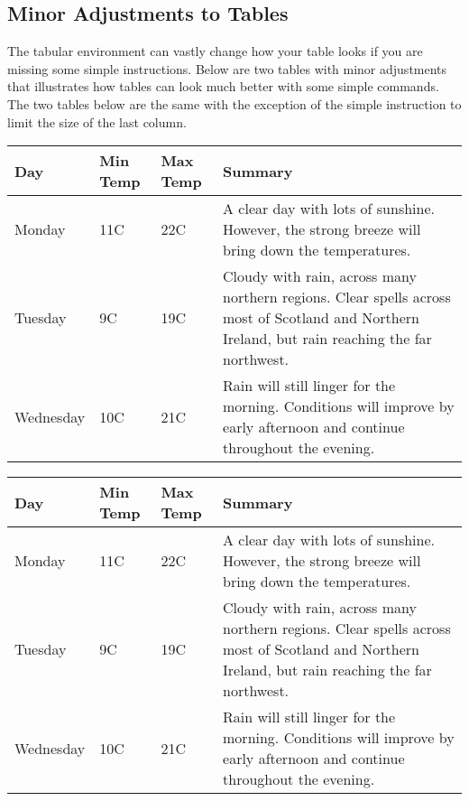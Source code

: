 \documentclass[10pt]{article}
\begin{document}
\subsection*{Minor Adjustments to Tables}
The tabular environment can vastly change how your table looks if you are missing some simple instructions. Below are two tables with minor adjustments that illustrates how tables can look much better with some simple commands. The two tables below are the same with the exception of the simple instruction to limit the size of the last column.

\begin{center}
    \begin{tabular}{| l | l | l | l |}
    \hline
    Day & Min Temp & Max Temp & Summary \\ \hline
    Monday & 11C & 22C & A clear day with lots of sunshine.
    However, the strong breeze will bring down the temperatures. \\ \hline
    Tuesday & 9C & 19C & Cloudy with rain, across many northern regions. Clear spells 
    across most of Scotland and Northern Ireland, 
    but rain reaching the far northwest. \\ \hline
    Wednesday & 10C & 21C & Rain will still linger for the morning. 
    Conditions will improve by early afternoon and continue 
    throughout the evening. \\
    \hline
    \end{tabular}
\end{center}
\vspace{5mm}

\begin{center}
    \begin{tabular}{ | l | l | l | p{5cm} |}
    \hline
    Day & Min Temp & Max Temp & Summary \\ \hline
    Monday & 11C & 22C & A clear day with lots of sunshine.  
    However, the strong breeze will bring down the temperatures. \\ \hline
    Tuesday & 9C & 19C & Cloudy with rain, across many northern regions. Clear spells 
    across most of Scotland and Northern Ireland, 
    but rain reaching the far northwest. \\ \hline
    Wednesday & 10C & 21C & Rain will still linger for the morning. 
    Conditions will improve by early afternoon and continue 
    throughout the evening. \\
    \hline
    \end{tabular}
\end{center}
\vspace{5mm}
\end{document}
